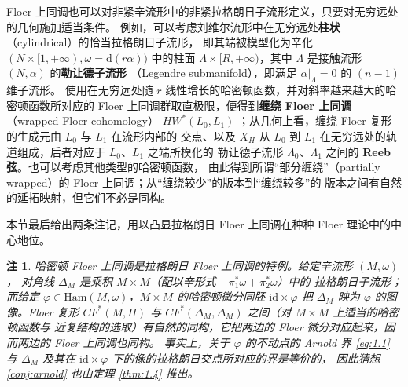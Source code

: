 \documentclass[UTF8,a4paper,11pt,fontset=windows]{ctexart}
\theoremstyle{cnthm}
\newtheorem{rem}[thm]{注}
\numberwithin{equation}{section}
\newcommand{\CF}{CF}                  %
\newcommand{\HW}{HW}                  %
\begin{document}

Floer 上同调也可以对非紧辛流形中的非紧拉格朗日子流形定义，只要对无穷远处的几何施加适当条件。
例如，可以考虑刘维尔流形中在无穷远处\textbf{柱状}（cylindrical）的恰当拉格朗日子流形，
即其端被模型化为辛化 $(N\times[1,+\infty),\omega=\mathrm{d}(r\alpha))$ 中的柱面
$\Lambda\times[R,+\infty)$，其中 $\Lambda$ 是接触流形 $(N,\alpha)$ 的\textbf{勒让德子流形}
（Legendre submanifold），即满足 $\alpha|_{\Lambda}=0$ 的 $(n-1)$ 维子流形。
使用在无穷远处随 $r$ 线性增长的哈密顿函数，并对斜率越来越大的哈密顿函数所对应的
Floer 上同调群取直极限，便得到\textbf{缠绕 Floer 上同调}（wrapped Floer cohomology）
$\HW^{*}(L_0,L_1)$ \cite{r12}；从几何上看，缠绕 Floer 复形的生成元由 $L_0$ 与 $L_1$ 在流形内部的
交点、以及 $X_H$ 从 $L_0$ 到 $L_1$ 在无穷远处的轨道组成，后者对应于 $L_0$、$L_1$ 之端所模化的
勒让德子流形 $\Lambda_0$、$\Lambda_1$ 之间的 \textbf{Reeb 弦}。也可以考虑其他类型的哈密顿函数，
由此得到所谓“部分缠绕”（partially wrapped）的 Floer 上同调；从“缠绕较少”的版本到“缠绕较多”的
版本之间有自然的延拓映射，但它们不必是同构。


本节最后给出两条注记，用以凸显拉格朗日 Floer 上同调在种种 Floer 理论中的中心地位。

\begin{rem}\label{rem:1.5}
哈密顿 Floer 上同调是拉格朗日 Floer 上同调的特例。给定辛流形 $(M,\omega)$，
对角线 $\Delta_M$ 是乘积 $M\times M$（配以辛形式 $-\pi_1^{*}\omega+\pi_2^{*}\omega$）中的
拉格朗日子流形；而给定 $\varphi\in\mathrm{Ham}(M,\omega)$，$M\times M$ 的哈密顿微分同胚
$\mathrm{id}\times\varphi$ 把 $\Delta_M$ 映为 $\varphi$ 的图像。Floer 复形
$\CF^{*}(M,H)$ 与 $\CF^{*}(\Delta_M,\Delta_M)$ 之间（对 $M\times M$ 上适当的哈密顿函数与
近复结构的选取）有自然的同构，它把两边的 Floer 微分对应起来，因而两边的 Floer 上同调也同构。
事实上，关于 $\varphi$ 的不动点的 Arnold 界 \eqref{eq:1.1} 与 $\Delta_M$ 及其在
$\mathrm{id}\times\varphi$ 下的像的拉格朗日交点所对应的界是等价的，
因此猜想 \ref{conj:arnold} 也由定理 \ref{thm:1.4} 推出。
\end{rem}
\end{document}

